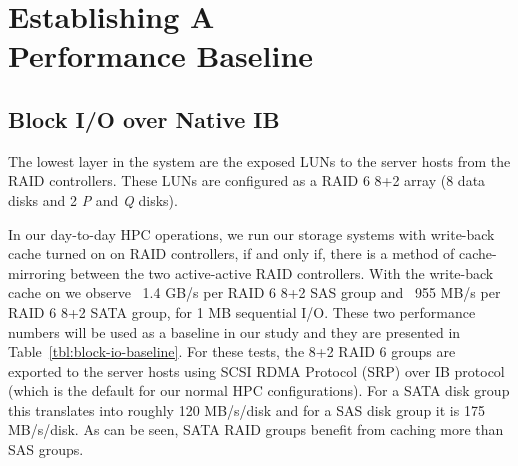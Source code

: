 \section{Establishing A \\Performance Baseline}
\label{sec:baseline}

\subsection{Block I/O over Native IB} 
\label{sec:block-io}

The lowest layer in the system are the exposed LUNs to the server hosts from
the RAID controllers.  These LUNs are configured as a RAID 6 8+2 array (8 data
disks and 2 \textit{P} and \textit{Q} disks). 


In our day-to-day HPC operations, we run our storage
systems with write-back cache turned on on RAID controllers, if and only if,
there is a method of cache-mirroring between the two active-active RAID
controllers. With the write-back cache on we observe \string~1.4 GB/s
per RAID 6 8+2 SAS group and  \string~955 MB/s per RAID 6 8+2 SATA
group, for 1 MB sequential I/O.  These two performance numbers will be used as
a baseline in our study and they are presented in
Table~\ref{tbl:block-io-baseline}.  For these tests, the 8+2 RAID 6 groups are
exported to the server hosts using SCSI RDMA Protocol (SRP) over IB protocol
(which is the default for our normal HPC configurations). For a SATA disk group
this translates into roughly 120 MB/s/disk and for a SAS disk group it is 175
MB/s/disk. As can be seen, SATA RAID groups benefit from caching more than SAS
groups. 


